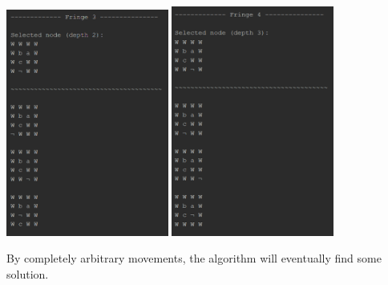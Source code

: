\documentclass{article}
\begin{document}
	\begin{multicols}{2}[\columnsep=2cm]
		\includegraphics[width=0.4\textwidth,keepaspectratio]{DFS-2-1.png}
		\columnbreak
		\includegraphics[width=0.4\textwidth,keepaspectratio]{DFS-2-2.png}
	\end{multicols}

	\newpage
	By completely arbitrary movements, the algorithm will eventually find some solution.
	
\end{document}
